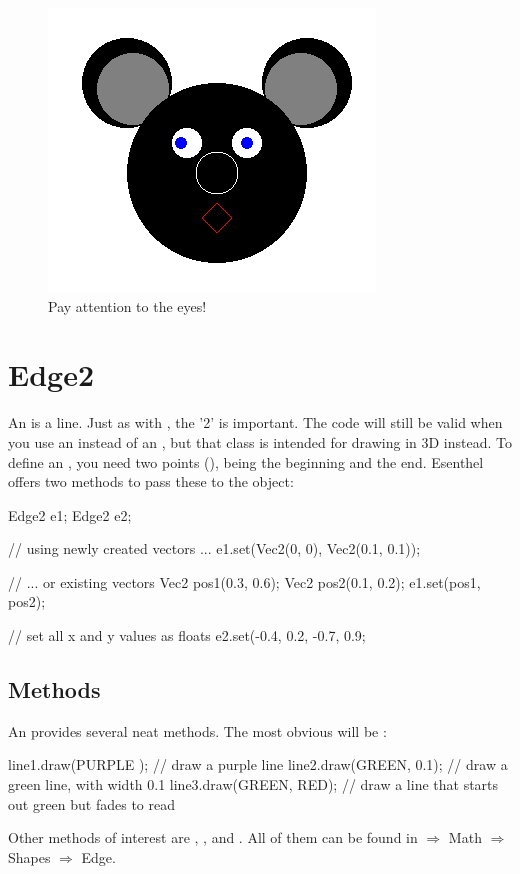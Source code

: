 \begin{figure}[h]
\centering
\includegraphics[width=0.4\linewidth]{images/circle_exercise.png}
\caption[]{Pay attention to the eyes!}
\label{fig:pos2D}
\end{figure}

\section{Edge2}
An  is a line. Just as with , the '2' is important. The code will still be valid when you use an  instead of an , but that class is intended for drawing in 3D instead. To define an , you need two points (), being the beginning and the end. Esenthel offers two methods to pass these to the object:

\begin{code}
Edge2 e1;
Edge2 e2;

// using newly created vectors ...
e1.set(Vec2(0, 0), Vec2(0.1, 0.1));

// ... or existing vectors
Vec2 pos1(0.3, 0.6);
Vec2 pos2(0.1, 0.2);
e1.set(pos1, pos2);

// set all x and y values as floats
e2.set(-0.4, 0.2, -0.7, 0.9;
\end{code}

\subsection{Methods}
An  provides several neat methods. The most obvious will be :

\begin{code}
line1.draw(PURPLE    ); // draw a purple line
line2.draw(GREEN, 0.1); // draw a green line, with width 0.1
line3.draw(GREEN, RED); // draw a line that starts out green but fades to read
\end{code}

Other methods of interest are , ,  and . All of them can be found in $\Rightarrow$ Math $\Rightarrow$ Shapes $\Rightarrow$ Edge.


